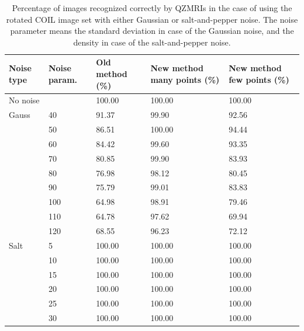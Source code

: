 \begin{table}
    \centering
    \begin{tabular}{|p{2.15cm}|p{1.8cm}|p{3cm}|p{2.74cm}|p{2.6cm}|} \hline
        \textbf{Noise type} & \textbf{Noise param.} & \textbf{Old method} (\%) & \textbf{New method} many points (\%)& \textbf{New method} few points (\%) \\ \hline\hline
        No noise & & 100.00 & 100.00 & 100.00 \\ \hline\hline
        Gauss & 40 & 91.37 & 99.90 & 92.56 \\ \cline{2-5}
        & 50 & 86.51 & 100.00 & 94.44 \\ \cline{2-5}
        & 60 & 84.42 & 99.60 & 93.35 \\ \cline{2-5}
        & 70 & 80.85 & 99.90 & 83.93 \\ \cline{2-5}
        & 80 & 76.98 & 98.12 & 80.45 \\ \cline{2-5}
        & 90 & 75.79 & 99.01 & 83.83 \\ \cline{2-5}
        & 100 & 64.98 & 98.91 & 79.46 \\ \cline{2-5}
        & 110 & 64.78 & 97.62 & 69.94 \\ \cline{2-5}
        & 120 & 68.55 & 96.23 & 72.12 \\ \hline\hline
        Salt & 5 & 100.00 & 100.00 & 100.00 \\ \cline{2-5}
        & 10 & 100.00 & 100.00 & 100.00 \\ \cline{2-5}
        & 15 & 100.00 & 100.00 & 100.00 \\ \cline{2-5}
        & 20 & 100.00 & 100.00 & 100.00 \\ \cline{2-5}
        & 25 & 100.00 & 100.00 & 100.00 \\ \cline{2-5}
        & 30 & 100.00 & 100.00 & 100.00 \\ \cline{1-5}
    \end{tabular}
    \caption{Percentage of images recognized correctly by QZMRIs in the case of using the rotated COIL image set with either Gaussian or salt-and-pepper noise. The noise parameter means the standard deviation in case of the Gaussian noise, and the density in case of the salt-and-pepper noise.}
    \label{tab:recognition_rot}
\end{table}

